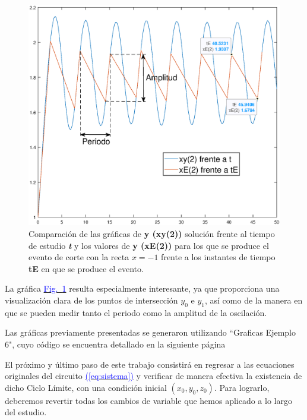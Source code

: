 \documentclass[12pt,a4paper]{report} %
\newcommand{\fref}[1]{\hyperref[#1]{\textcolor{blue}{Fig.~\ref*{#1}}}}
\newcommand{\eref}[1]{\hyperref[#1]{\textcolor{blue}{(\ref*{#1})}}}
\newcommand{\fref}[1]{\hyperref[#1]{\textcolor{blue}{\textit{Fig.~\ref*{#1}}}}}
\newcommand{\eref}[1]{\hyperref[#1]{\textcolor{blue}{\textit{(\ref*{#1})}}}}
\begin{document}
	\begin{figure}[h]
		\centering
		\includegraphics[width=1\textwidth]{g3ejem6.eps}
		\caption{Comparación de las gráficas de \textbf{y (xy(2))} solución frente al tiempo de estudio \textit{\textbf{t}} y los valores de \textbf{y (xE(2))} para los que se produce el evento de corte con la recta $x=-1$ frente a los instantes de tiempo \textbf{tE} en que se produce el evento.}
		\label{fig:g3ejem6}
	\end{figure}\smallskip
	
	\vspace{0.5cm}\noindent La gráfica \fref{fig:g3ejem6} resulta especialmente interesante, ya que proporciona una visualización clara de los puntos de intersección $y_0$ e $y_1$, así como de la manera en que se pueden medir tanto el periodo como la amplitud de la oscilación.
	
	\vspace{0.5cm}\noindent Las gráficas previamente presentadas se generaron utilizando ``Graficas Ejemplo 6", cuyo código se encuentra detallado en la siguiente página
	
	\newpage
	
	\vspace{0.5cm}
	
	\newpage
	
	El próximo y último paso de este trabajo consistirá en regresar a las ecuaciones originales del circuito \eref{eq:sistema} y verificar de manera efectiva la existencia de dicho Ciclo Límite, con una condición inicial $(x_0,y_0,z_0)$. Para lograrlo, deberemos revertir todas los cambios de variable que hemos aplicado a lo largo del estudio. 
	
\end{document}

